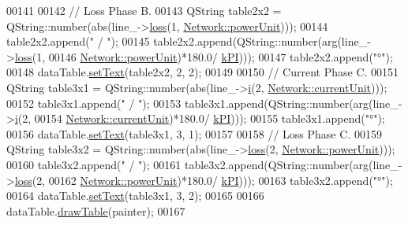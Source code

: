 \begin{DoxyCode}
00141 
00142   \textcolor{comment}{// Loss Phase B.}
00143   QString table2x2 = QString::number(abs(line\_->\hyperlink{group___models_ga7909d69e419de3f460ca7abab3d91e53}{loss}(1, \hyperlink{group___graphics_ga9504015bc566f4a3d3b4d4a86000293b}{Network::powerUnit})));
00144   table2x2.append(\textcolor{stringliteral}{" / "});
00145   table2x2.append(QString::number(arg(line\_->\hyperlink{group___models_ga7909d69e419de3f460ca7abab3d91e53}{loss}(1,
00146                                       \hyperlink{group___graphics_ga9504015bc566f4a3d3b4d4a86000293b}{Network::powerUnit})*180.0/
      \hyperlink{math__constants_8h_a368d99984512d9a6c6f18b37b4446431}{kPI})));
00147   table2x2.append(\textcolor{stringliteral}{"°"});
00148   dataTable.\hyperlink{class_data_table_aee0d28c77116b51360f0124a529cb3ff}{setText}(table2x2, 2, 2);
00149 
00150   \textcolor{comment}{// Current Phase C.}
00151   QString table3x1 = QString::number(abs(line\_->\hyperlink{group___models_gaf81e7055102816465bdf7e19afc2d547}{i}(2, \hyperlink{group___graphics_gac6a26db5fef2b1dd2a00faf6340d1702}{Network::currentUnit})));
00152   table3x1.append(\textcolor{stringliteral}{" / "});
00153   table3x1.append(QString::number(arg(line\_->\hyperlink{group___models_gaf81e7055102816465bdf7e19afc2d547}{i}(2,
00154                                       \hyperlink{group___graphics_gac6a26db5fef2b1dd2a00faf6340d1702}{Network::currentUnit})*180.0/
      \hyperlink{math__constants_8h_a368d99984512d9a6c6f18b37b4446431}{kPI})));
00155   table3x1.append(\textcolor{stringliteral}{"°"});
00156   dataTable.\hyperlink{class_data_table_aee0d28c77116b51360f0124a529cb3ff}{setText}(table3x1, 3, 1);
00157 
00158   \textcolor{comment}{// Loss Phase C.}
00159   QString table3x2 = QString::number(abs(line\_->\hyperlink{group___models_ga7909d69e419de3f460ca7abab3d91e53}{loss}(2, \hyperlink{group___graphics_ga9504015bc566f4a3d3b4d4a86000293b}{Network::powerUnit})));
00160   table3x2.append(\textcolor{stringliteral}{" / "});
00161   table3x2.append(QString::number(arg(line\_->\hyperlink{group___models_ga7909d69e419de3f460ca7abab3d91e53}{loss}(2,
00162                                       \hyperlink{group___graphics_ga9504015bc566f4a3d3b4d4a86000293b}{Network::powerUnit})*180.0/
      \hyperlink{math__constants_8h_a368d99984512d9a6c6f18b37b4446431}{kPI})));
00163   table3x2.append(\textcolor{stringliteral}{"°"});
00164   dataTable.\hyperlink{class_data_table_aee0d28c77116b51360f0124a529cb3ff}{setText}(table3x1, 3, 2);
00165 
00166   dataTable.\hyperlink{class_data_table_a3a3695e88dcd4d4aad5cc941ec7e6e55}{drawTable}(painter);
00167 

\end{DoxyCode}
